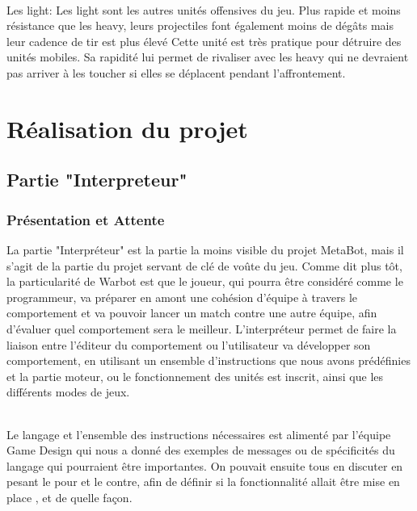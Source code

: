 \documentclass{report}
\begin{document}
\paragraph{}
Les light:\newline
Les light sont les autres unités offensives du jeu. Plus rapide et moins résistance que les heavy, leurs projectiles font également moins de dégâts mais leur cadence de tir est plus élevé \newline
Cette unité est très pratique pour détruire des unités mobiles. Sa rapidité lui permet de rivaliser avec les heavy qui ne devraient pas arriver à les toucher si elles se déplacent pendant l'affrontement.
\newpage
\part{Réalisation du projet}
\newpage



\newpage
\chapter{Partie "Interpreteur"}
\section{Présentation et Attente}
La partie "Interpréteur" est la partie la moins visible du projet MetaBot,
mais il s'agit de la partie du projet servant de clé de voûte du jeu.
Comme dit plus tôt, la particularité de Warbot est que le joueur, qui pourra être considéré comme le programmeur, va préparer en amont une cohésion d'équipe à travers le comportement et va pouvoir lancer un match contre une autre équipe, afin d'évaluer quel comportement sera le meilleur.
L'interpréteur permet de faire la liaison entre l'éditeur du comportement ou l'utilisateur va développer son comportement, en utilisant un ensemble d'instructions que nous avons prédéfinies  et la partie moteur, ou le fonctionnement des unités est inscrit, ainsi que les différents modes de jeux.
\paragraph{}
Le langage et l'ensemble des instructions nécessaires est alimenté par l'équipe Game Design qui nous a donné des exemples de messages ou de spécificités du langage qui pourraient être importantes. On pouvait ensuite tous en discuter en pesant le pour et le contre, afin de définir si la fonctionnalité allait être mise en place , et de quelle façon.
\end{document}
